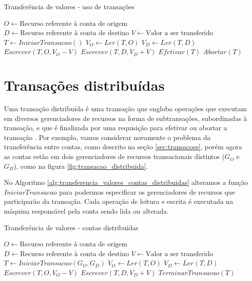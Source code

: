 \documentclass[11pt,twoside,a4paper]{book}
\begin{document}
\begin{algorithm}
\caption{Transferência de valores - uso de transações}
\label{alg:transferencia_valores_transacao}
\begin{algorithmic}[1]
\State $O \gets \text{Recurso referente à conta de origem}$
\State $D \gets \text{Recurso referente à conta de destino}$
\State $V \gets \text{Valor a ser transferido}$
\State $T \gets IniciarTransacao()$
\State $V_O \gets Ler(T, O)$
    \State $V_D \gets Ler(T, D)$
    \State $Escrever(T, O, V_O - V)$
    \State $Escrever(T, D, V_D + V)$
    \State $Efetivar(T)$
\Else
    \State $Abortar(T)$
\EndIf
\end{algorithmic}
\end{algorithm}

\section{Transações distribuídas}
\label{sec:transacoes_distribuidas}
Uma transação distribuída é uma transação que engloba operações que executam em diversos gerenciadores de recursos na forma de subtransações, subordinadas à transação, e que é finalizada por uma requisição para efetivar ou abortar a transação \cite{gray-lamport}. Por exemplo, vamos considerar novamente o problema da transferência entre contas, como descrito na seção \ref{sec:transacoes}, porém agora as contas estão em dois gerenciadores de recursos transacionais distintos ($G_O$ e $G_D$), como na figura \ref{fig:transacao_distribuida}. 

No Algoritmo \ref{alg:transferencia_valores_contas_distribuidas} alteramos a função $IniciarTransacao$ para podermos especificar os gerenciadores de recursos que participarão da transação. Cada operação de leitura e escrita é executada na máquina responsável pela conta sendo lida ou alterada.

\begin{algorithm}
\caption{Transferência de valores - contas distribuídas}
\label{alg:transferencia_valores_contas_distribuidas}
\begin{algorithmic}[1]
\State $O \gets \text{Recurso referente à conta de origem}$
\State $D \gets \text{Recurso referente à conta de destino}$
\State $V \gets \text{Valor a ser transferido}$
\State $T \gets IniciarTransacao(G_O, G_D)$
\State $V_O \gets Ler(T, O)$
    \State $V_D \gets Ler(T, D)$
    \State $Escrever(T, O, V_O - V)$
    \State $Escrever(T, D, V_D + V)$
\EndIf
\State $TerminarTransacao(T)$
\end{algorithmic}
\end{algorithm}
\end{document}
